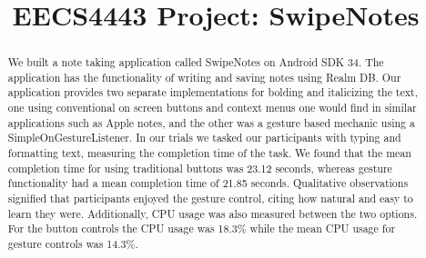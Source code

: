 \documentclass[conference]{IEEEtran}
\begin{document}
\title{EECS4443 Project: SwipeNotes\\}

\author{
    \and
    \and
    \and
}

\maketitle

\begin{abstract}
We built a note taking application called SwipeNotes on Android SDK 34. The application has the functionality of writing and saving notes using Realm DB. Our application provides two separate implementations for bolding and italicizing the text, one using conventional on screen buttons and context menus one would find in similar applications such as Apple notes, and the other was a gesture based mechanic using a SimpleOnGestureListener. In our trials we tasked our participants with typing and formatting text, measuring the completion time of the task. We found that the mean completion time for using traditional buttons was 23.12 seconds, whereas gesture functionality had a mean completion time of 21.85 seconds. Qualitative observations signified that participants enjoyed the gesture control, citing how natural and easy to learn they were. Additionally, CPU usage was also measured between the two options. For the button controls the CPU usage was 18.3\% while the mean CPU usage for gesture controls was 14.3\%.
\end{abstract}
\end{document}
